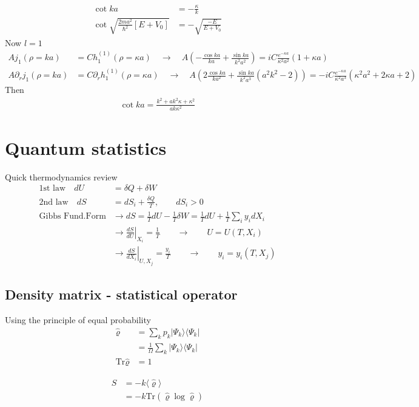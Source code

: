 \documentclass[10pt,a4paper]{book}
\theoremstyle{definition}
\begin{document}
\begin{align}
\cot ka&=-\frac{\kappa}{k}\\
\cot\sqrt{\frac{2ma^2}{\hbar^2}[E+V_0]}&=-\sqrt{\frac{-E}{E+V_0}}
\end{align}
Now $l=1$
\begin{align}
Aj_1(\rho=ka)&=Ch^{(1)}_1(\rho=\kappa a)\quad\rightarrow\quad A\left(-\frac{\cos ka}{ka}+\frac{\sin ka}{k^2a^2}\right)=iC\frac{e^{-\kappa a}}{\kappa^2 a^2}(1+\kappa a)\\
A\partial_r j_1(\rho=ka)&=C\partial_r h^{(1)}_1(\rho=\kappa a)\quad\rightarrow\quad A\left(2\frac{\cos ka}{ka^2}+\frac{\sin ka}{k^2a^3}(a^2k^2-2)\right)=-iC\frac{e^{-\kappa a}}{\kappa^2 a^3}(\kappa^2 a^2+2\kappa a +2)
\end{align}
Then
\begin{align}
\cot ka=\frac{k^2+ak^2\kappa+\kappa^2}{ak\kappa^2}
\end{align}




\section{Quantum statistics}
Quick thermodynamics review
\begin{align}
\text{1st law}\quad dU&=\delta Q+\delta W\\
\text{2nd law}\quad dS&=dS_i+\frac{\delta Q}{T}, \qquad dS_i>0\\
\text{Gibbs Fund.Form}&\rightarrow dS=\frac{1}{T}dU-\frac{1}{T}\delta W=\frac{1}{T}dU+\frac{1}{T}\sum_i y_idX_i\\
&\rightarrow \left.\frac{dS}{dU}\right|_{X_i}=\frac{1}{T}\qquad\rightarrow\qquad U=U(T,X_i)\\
&\rightarrow \left.\frac{dS}{dX_i}\right|_{U,X_j}=\frac{y_i}{T}\qquad\rightarrow\qquad y_i=y_i(T,X_j)
\end{align}

\subsection{Density matrix - statistical operator}
Using the principle of equal probability
\begin{align}
\hat{\varrho}&=\sum_k p_k|\Psi_k\rangle\langle\Psi_k|\\
&=\frac{1}{\Omega}\sum_k |\Psi_k\rangle\langle\Psi_k|\\
\text{Tr}\hat\varrho&=1
\end{align}

\begin{align}
S
&=-k\langle\hat\varrho\rangle\\
&=-k\text{Tr}(\hat\varrho\log\hat\varrho)\\
\end{align}
\end{document}
